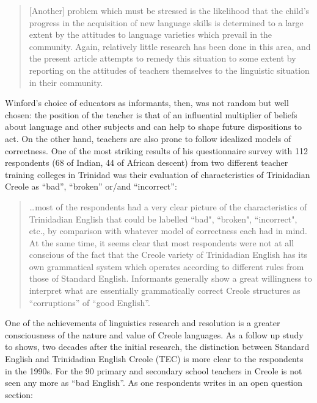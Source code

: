\documentclass[output=paper,colorlinks,citecolor=brown]{langscibook}
\begin{document}
\begin{quote}
    [Another] problem which must be stressed is the likelihood that the child's progress in the acquisition of new language skills is determined to a large extent by the attitudes to language varieties which prevail in the community. Again, relatively little research has been done in this area, and the present article attempts to remedy this situation to some extent by reporting on the attitudes of teachers themselves to the linguistic situation in their community. \citep[48]{winford1976teacher}
\end{quote}

Winford’s choice of educators as informants, then, was not random but well chosen: the position of the teacher is that of an influential multiplier of beliefs about language and other subjects and can help to shape future dispositions to act. On the other hand, teachers are also prone to follow idealized models of correctness. One of the most striking results of his questionnaire survey with 112 respondents (68 of Indian, 44 of African descent) from two different teacher training colleges in Trinidad was their evaluation of characteristics of Trinidadian Creole as “bad”, “broken” or/and “incorrect”:

\begin{quote}
    \ldots most of the respondents had a very clear picture of the characteristics of Trinidadian English that could be labelled “bad", “broken", “incorrect", etc., by comparison with whatever model of correctness each had in mind. At the same time, it seems clear that most respondents were not at all conscious of the fact that the Creole variety of Trinidadian English has its own grammatical system which operates according to different rules from those of Standard English. Informants generally show a great willingness to interpret what are essentially grammatically correct Creole structures as ``corruptions'' of ``good English''.
    \citep[51]{winford1976teacher}
\end{quote}


One of the achievements of linguistics research and resolution is a greater consciousness of the nature and value of Creole languages. As a follow up study \citep{mühleisen1993attitudes,mühleisen2001bad} to \citet{winford1976teacher} shows, two decades after the initial research, the distinction between Standard English and Trinidadian English Creole (TEC) is more clear to the respondents in the 1990s. For the 90 primary and secondary school teachers in \citet{mühleisen1993attitudes,mühleisen2001bad} Creole is not seen any more as ``bad English''. As one respondents writes in an open question section:
\end{document}
